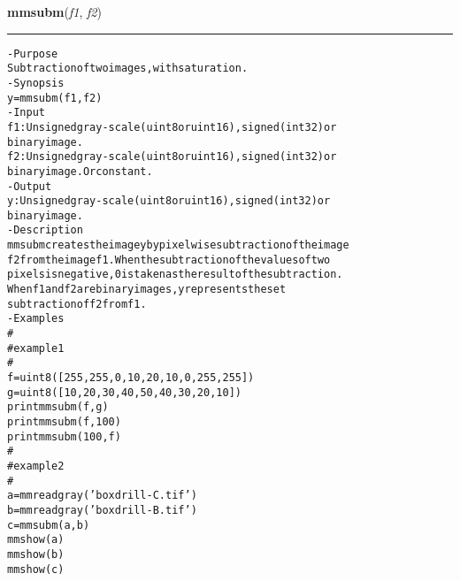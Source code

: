    \begin{boxedminipage}{\textwidth}

    \raggedright \textbf{mmsubm}(\textit{f1}, \textit{f2})

    \vspace{-1.5ex}

    \rule{\textwidth}{0.5\fboxrule}
\begin{alltt}
- Purpose
    Subtraction of two images, with saturation.
- Synopsis
    y = mmsubm(f1, f2)
- Input
    f1: Unsigned gray-scale (uint8 or uint16), signed (int32) or
        binary image.
    f2: Unsigned gray-scale (uint8 or uint16), signed (int32) or
        binary image. Or constant.
- Output
    y: Unsigned gray-scale (uint8 or uint16), signed (int32) or
       binary image.
- Description
    mmsubm creates the image y by pixelwise subtraction of the image
    f2 from the image f1 . When the subtraction of the values of two
    pixels is negative, 0 is taken as the result of the subtraction.
    When f1 and f2 are binary images, y represents the set
    subtraction of f2 from f1 .
- Examples
    \#
    \#   example 1
    \#
    f = uint8([255,   255,    0,   10,   20,   10,    0,   255,  255])
    g = uint8([10,     20,   30,   40,   50,   40,   30,    20,    10])
    print mmsubm(f, g)
    print mmsubm(f, 100)
    print mmsubm(100, f)
    \#
    \#   example 2
    \#
    a = mmreadgray('boxdrill-C.tif')
    b = mmreadgray('boxdrill-B.tif')
    c = mmsubm(a,b)
    mmshow(a)
    mmshow(b)
    mmshow(c)\end{alltt}

    \vspace{1ex}

    \end{boxedminipage}

    \label{multireg:num_pymorph:mmsubm_old}
    \vspace{0.5ex}

